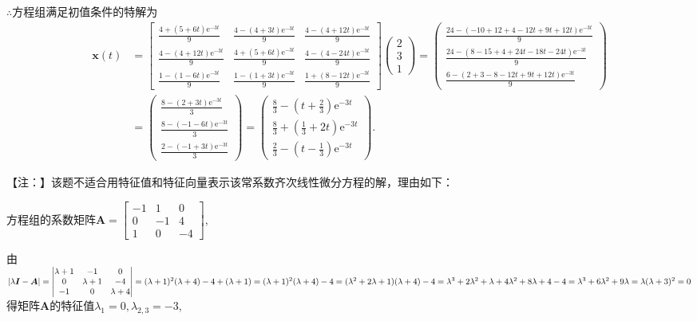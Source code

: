 \documentclass[12pt,UTF8]{ctexart}
\newcommand{\me}[0]{\mathrm e}
\begin{document}
\begin{enumerate}
$\therefore$方程组满足初值条件的特解为
\[\begin{aligned}
\bm x(t)&=\begin{bmatrix}
\frac{4+(5+6t)\me^{-3t}}9&\frac{4-(4+3t)\me^{-3t}}9&\frac{4-(4+12t)\me^{-3t}}9\\
\frac{4-(4+12t)\me^{-3t}}9&\frac{4+(5+6t)\me^{-3t}}9&\frac{4-(4-24t)\me^{-3t}}9\\
\frac{1-(1-6t)\me^{-3t}}9&\frac{1-(1+3t)\me^{-3t}}9&\frac{1+(8-12t)\me^{-3t}}9
\end{bmatrix}\begin{pmatrix}2\\3\\1\end{pmatrix}=\begin{pmatrix}
\frac{24-(-10+12+4-12t+9t+12t)\me^{-3t}}9\\
\frac{24-(8-15+4+24t-18t-24t)\me^{-3t}}9\\
\frac{6-(2+3-8-12t+9t+12t)\me^{-3t}}9
\end{pmatrix}\\
&=\begin{pmatrix}
\frac{8-(2+3t)\me^{-3t}}3\\
\frac{8-(-1-6t)\me^{-3t}}3\\
\frac{2-(-1+3t)\me^{-3t}}3
\end{pmatrix}=\begin{pmatrix}
\frac83-(t+\frac23)\me^{-3t}\\
\frac83+(\frac13+2t)\me^{-3t}\\
\frac23-(t-\frac13)\me^{-3t}
\end{pmatrix}.
\end{aligned}\]

【注：】该题不适合用特征值和特征向量表示该常系数齐次线性微分方程的解，理由如下：

方程组的系数矩阵$\bm A=\begin{bmatrix}-1&1&0\\0&-1&4\\1&0&-4\end{bmatrix}$, 

由$|\lambda\bm I-\bm A|=\begin{vmatrix}\lambda+1&-1&0\\0&\lambda+1&-4\\-1&0&\lambda+4\end{vmatrix}=(\lambda+1)^2(\lambda+4)-4+(\lambda+1)=(\lambda+1)^2(\lambda+4)-4\\
=(\lambda^2+2\lambda+1)(\lambda+4)-4=\lambda^3+2\lambda^2+\lambda+4\lambda^2+8\lambda+4-4=\lambda^3+6\lambda^2+9\lambda=\lambda(\lambda+3)^2=0$得矩阵$\bm A$的特征值$\lambda_1=0,\lambda_{2,3}=-3$, 


\end{enumerate}
\end{document}
